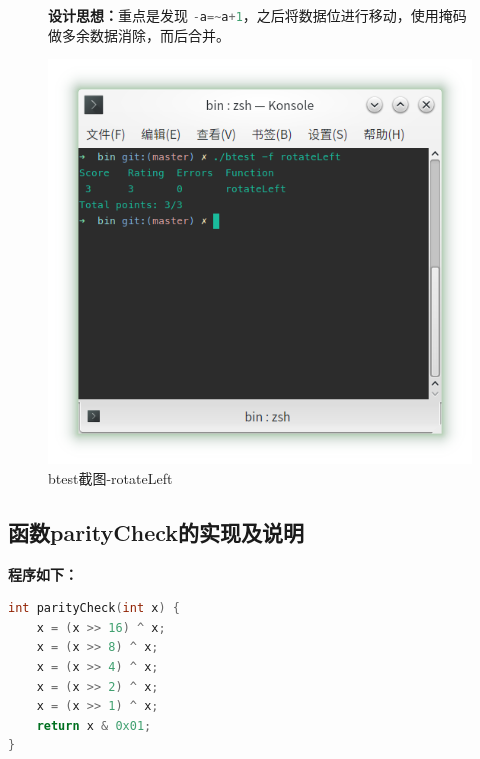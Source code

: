 \begin{figure}[H]
\begin{minipage}[c]{0.5\linewidth}
\textbf{设计思想：}重点是发现 \lstinline[language=c]|-a=~a+1|，之后将数据位进行移动，使用掩码做多余数据消除，而后合并。
\end{minipage}
\begin{minipage}[c]{0.4\linewidth}
\centering
\includegraphics[width=0.9\linewidth]{figures/rotateLeft}
\caption{btest截图-rotateLeft}
\label{fig:rotateLeft}
\end{minipage}
\end{figure}

\subsection{函数parityCheck的实现及说明}

\textbf{程序如下：}

\begin{lstlisting}[language = c]
int parityCheck(int x) {
    x = (x >> 16) ^ x;
    x = (x >> 8) ^ x;
    x = (x >> 4) ^ x;
    x = (x >> 2) ^ x;
    x = (x >> 1) ^ x;
    return x & 0x01;
}
\end{lstlisting}

